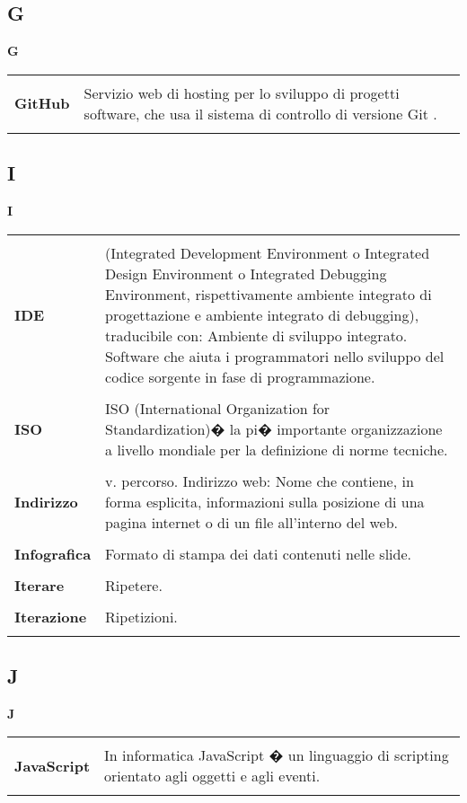 {\subsection{G} 
\hfill\Huge{\textbf{G}} \\ 
\normalsize 
\begin{longtabu} to 
\toprule \\ 
\textbf{GitHub} & Servizio web di hosting per lo sviluppo di progetti software, che usa il sistema di controllo di versione Git . \\ 
 \\ 
\end{longtabu} 
\newpage 
\subsection{I} 
\hfill\Huge{\textbf{I}} \\ 
\normalsize 
\begin{longtabu} to 
\toprule \\ 
\textbf{IDE} & (Integrated Development Environment o Integrated Design Environment o Integrated Debugging Environment, rispettivamente ambiente integrato di progettazione e ambiente integrato di debugging), traducibile con: Ambiente di sviluppo integrato. Software che aiuta i programmatori nello sviluppo del codice sorgente in fase di programmazione. \\ 
 \\ 
\textbf{ISO} & ISO (International Organization for Standardization)� la pi� importante organizzazione a livello mondiale per la definizione di norme tecniche. \\ 
 \\ 
\textbf{Indirizzo} & v. percorso. Indirizzo web: Nome che contiene, in forma esplicita, informazioni sulla posizione di una pagina internet o di un file all'interno del web. \\ 
 \\ 
\textbf{Infografica} & Formato di stampa dei dati contenuti nelle slide. \\ 
 \\ 
\textbf{Iterare} & Ripetere. \\ 
 \\ 
\textbf{Iterazione} & Ripetizioni. \\ 
 \\ 
\end{longtabu} 
\newpage 
\subsection{J} 
\hfill\Huge{\textbf{J}} \\ 
\normalsize 
\begin{longtabu} to 
\toprule \\ 
\textbf{JavaScript} & In informatica JavaScript � un linguaggio di scripting orientato agli oggetti e agli eventi. \\ 
 \\ 
\end{longtabu} 
\newpage 
}
